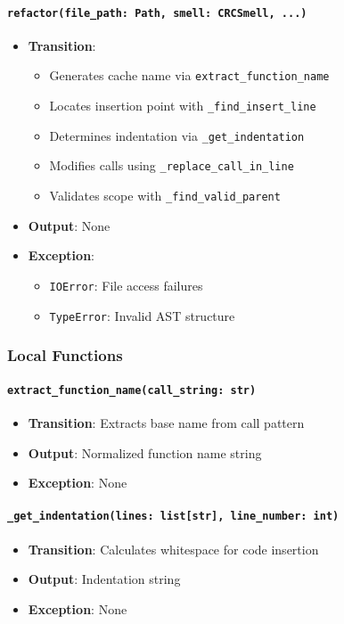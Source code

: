 \documentclass[12pt, titlepage]{article}
\begin{document}
\paragraph{\texttt{refactor(file\_path: Path, smell: CRCSmell, ...)}}
\begin{itemize}
\item \textbf{Transition}:
\begin{itemize}
\item Generates cache name via \texttt{extract\_function\_name}
\item Locates insertion point with \texttt{\_find\_insert\_line}
\item Determines indentation via \texttt{\_get\_indentation}
\item Modifies calls using \texttt{\_replace\_call\_in\_line}
\item Validates scope with \texttt{\_find\_valid\_parent}
\end{itemize}
\item \textbf{Output}: None
\item \textbf{Exception}:
\begin{itemize}
\item \texttt{IOError}: File access failures
\item \texttt{TypeError}: Invalid AST structure
\end{itemize}
\end{itemize}

\subsubsection{Local Functions}

\paragraph{\texttt{extract\_function\_name(call\_string: str)}}
\begin{itemize}
\item \textbf{Transition}: Extracts base name from call pattern
\item \textbf{Output}: Normalized function name string
\item \textbf{Exception}: None
\end{itemize}

\paragraph{\texttt{\_get\_indentation(lines: list[str], line\_number: int)}}
\begin{itemize}
\item \textbf{Transition}: Calculates whitespace for code insertion
\item \textbf{Output}: Indentation string
\item \textbf{Exception}: None
\end{itemize}
\end{document}
